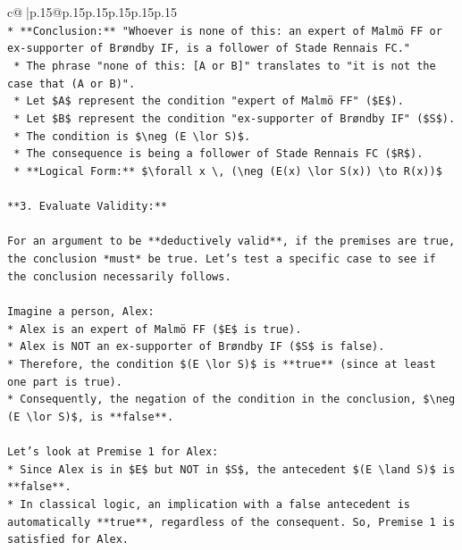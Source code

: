 \documentclass{article}
\begin{document}
{\begin{supertabular}{c@{$\;$}|p{.15\linewidth}@{}p{.15\linewidth}p{.15\linewidth}p{.15\linewidth}p{.15\linewidth}p{.15\linewidth}}
{{{\\ 
\texttt{*   **Conclusion:** "Whoever is none of this: an expert of Malmö FF or ex{-}supporter of Brøndby IF, is a follower of Stade Rennais FC."} \\
\texttt{    *   The phrase "none of this: {[}A or B{]}" translates to "it is not the case that (A or B)".} \\
\texttt{    *   Let \$A\$ represent the condition "expert of Malmö FF" (\$E\$).} \\
\texttt{    *   Let \$B\$ represent the condition "ex{-}supporter of Brøndby IF" (\$S\$).} \\
\texttt{    *   The condition is \$\textbackslash{}neg (E \textbackslash{}lor S)\$.} \\
\texttt{    *   The consequence is being a follower of Stade Rennais FC (\$R\$).} \\
\texttt{    *   **Logical Form:** \$\textbackslash{}forall x \textbackslash{}, (\textbackslash{}neg (E(x) \textbackslash{}lor S(x)) \textbackslash{}to R(x))\$} \\
\\ 
\texttt{**3. Evaluate Validity:**} \\
\\ 
\texttt{For an argument to be **deductively valid**, if the premises are true, the conclusion *must* be true. Let's test a specific case to see if the conclusion necessarily follows.} \\
\\ 
\texttt{Imagine a person, Alex:} \\
\texttt{*   Alex is an expert of Malmö FF (\$E\$ is true).} \\
\texttt{*   Alex is NOT an ex{-}supporter of Brøndby IF (\$S\$ is false).} \\
\texttt{*   Therefore, the condition \$(E \textbackslash{}lor S)\$ is **true** (since at least one part is true).} \\
\texttt{*   Consequently, the negation of the condition in the conclusion, \$\textbackslash{}neg (E \textbackslash{}lor S)\$, is **false**.} \\
\\ 
\texttt{Let's look at Premise 1 for Alex:} \\
\texttt{*   Since Alex is in \$E\$ but NOT in \$S\$, the antecedent \$(E \textbackslash{}land S)\$ is **false**.} \\
\texttt{*   In classical logic, an implication with a false antecedent is automatically **true**, regardless of the consequent. So, Premise 1 is satisfied for Alex.} \\
}}}
\end{supertabular}}
\end{document}
